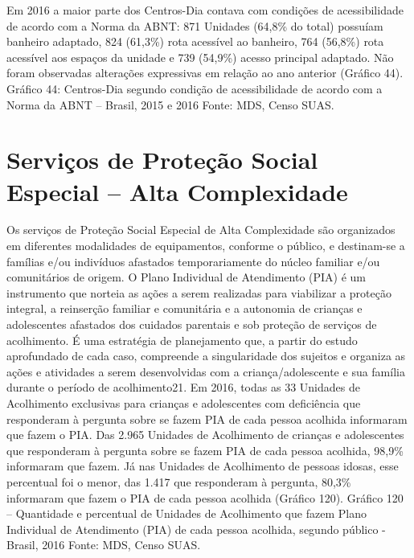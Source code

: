 \documentclass[
  brazilian]{report}
\begin{document}
Em 2016 a maior parte dos Centros-Dia contava com condições de
acessibilidade de acordo com a Norma da ABNT: 871 Unidades (64,8\% do
total) possuíam banheiro adaptado, 824 (61,3\%) rota acessível ao
banheiro, 764 (56,8\%) rota acessível aos espaços da unidade e 739
(54,9\%) acesso principal adaptado. Não foram observadas alterações
expressivas em relação ao ano anterior (Gráfico 44). Gráfico 44:
Centros-Dia segundo condição de acessibilidade de acordo com a Norma da
ABNT -- Brasil, 2015 e 2016 Fonte: MDS, Censo SUAS.

\hypertarget{serviuxe7os-de-proteuxe7uxe3o-social-especial-alta-complexidade}{%
\section{Serviços de Proteção Social Especial -- Alta
Complexidade}\label{serviuxe7os-de-proteuxe7uxe3o-social-especial-alta-complexidade}}

Os serviços de Proteção Social Especial de Alta Complexidade são
organizados em diferentes modalidades de equipamentos, conforme o
público, e destinam-se a famílias e/ou indivíduos afastados
temporariamente do núcleo familiar e/ou comunitários de origem. O Plano
Individual de Atendimento (PIA) é um instrumento que norteia as ações a
serem realizadas para viabilizar a proteção integral, a reinserção
familiar e comunitária e a autonomia de crianças e adolescentes
afastados dos cuidados parentais e sob proteção de serviços de
acolhimento. É uma estratégia de planejamento que, a partir do estudo
aprofundado de cada caso, compreende a singularidade dos sujeitos e
organiza as ações e atividades a serem desenvolvidas com a
criança/adolescente e sua família durante o período de acolhimento21. Em
2016, todas as 33 Unidades de Acolhimento exclusivas para crianças e
adolescentes com deficiência que responderam à pergunta sobre se fazem
PIA de cada pessoa acolhida informaram que fazem o PIA. Das 2.965
Unidades de Acolhimento de crianças e adolescentes que responderam à
pergunta sobre se fazem PIA de cada pessoa acolhida, 98,9\% informaram
que fazem. Já nas Unidades de Acolhimento de pessoas idosas, esse
percentual foi o menor, das 1.417 que responderam à pergunta, 80,3\%
informaram que fazem o PIA de cada pessoa acolhida (Gráfico 120).
Gráfico 120 -- Quantidade e percentual de Unidades de Acolhimento que
fazem Plano Individual de Atendimento (PIA) de cada pessoa acolhida,
segundo público - Brasil, 2016 Fonte: MDS, Censo SUAS.
\end{document}
